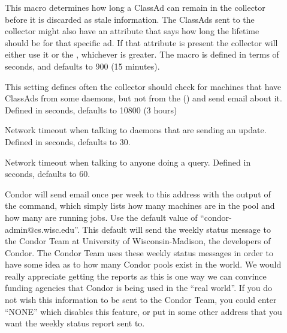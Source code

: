 \begin{description}
  
\item[] \label{param:ClassadLifetime} This
  macro determines how long a ClassAd can remain in the collector
  before it is discarded as stale information.  The ClassAds sent to
  the collector might also have an attribute that says how long the
  lifetime should be for that specific ad.  If that attribute is
  present the collector will either use it or the
  , whichever is greater.  The macro is
  defined in terms of seconds, and defaults to 900 (15 minutes).
  
\item[]
  \label{param:MasterCheckInterval}  This setting defines often the
  collector should check for machines that have ClassAds from some
  daemons, but not from the  ()
  and send email about it.  Defined in seconds, defaults to 10800 (3
  hours)
  
\item[] \label{param:ClientTimeout} Network
  timeout when talking to daemons that are sending an update.  Defined
  in seconds, defaults to 30.
  
\item[] \label{param:QueryTimeout} Network
  timeout when talking to anyone doing a query. Defined in seconds,
  defaults to 60.
  
\item[] \label{param:CondorDevelopers}
  Condor will send email once per week to this address with the output
  of the  command, which simply lists how many machines
  are in the pool and how many are running jobs.  Use the default
  value of ``condor-admin@cs.wisc.edu''. This default will send the
  weekly status message to the Condor Team at University of
  Wisconsin-Madison, the developers of Condor.  The Condor Team uses
  these weekly status messages in order to have some idea as to how
  many Condor pools exist in the world.  We would really appreciate
  getting the reports as this is one way we can convince funding
  agencies that Condor is being used in the ``real world''.  If you do
  not wish this information to be sent to the Condor Team, you could
  enter ``NONE'' which disables this feature, or put in some other
  address that you want the weekly status report sent to.


\end{description}
